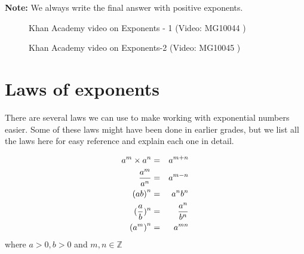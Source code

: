       
\textbf{Note:} We always write the final answer with positive exponents.

\setcounter{subfigure}{0}
\begin{figure}[H] %
\textnormal{Khan Academy video on Exponents - 1}\vspace{.1in} 
\label{m38359*yt-media1}\label{m38359*yt-video1}
 { (Video:  MG10044 )}
\end{figure}       


\setcounter{subfigure}{0}
\begin{figure}[H] %
\textnormal{Khan Academy video on Exponents-2}\vspace{.1in} 
\label{m38359*yt-media2}\label{m38359*yt-video2}
 { (Video:  MG10045 )}
\end{figure}       




\section {Laws of exponents}
There are several laws we can use to make working with exponential numbers easier. 
Some of these laws might have been done in earlier grades, but we list all the laws here for easy reference and explain each one in detail. 


\begin{eqnarray*}
a^{m}\times a^{n}& =& a^{m+n}\hfill \\ 
\frac{a^{m}}{a^{n}}& =& a^{m-n}\hfill \\ 
{(ab)}^{n}& =& a^{n}b^{n}\hfill \\ 
        (\frac{a}{b})^n & = & \frac{a^n}{b^n} \\
{({a}^{m})}^{n}& =& a^{mn}\hfill 
\end{eqnarray*}
where $a > 0, b > 0$ and $m,n \in \mathbb{Z}$



